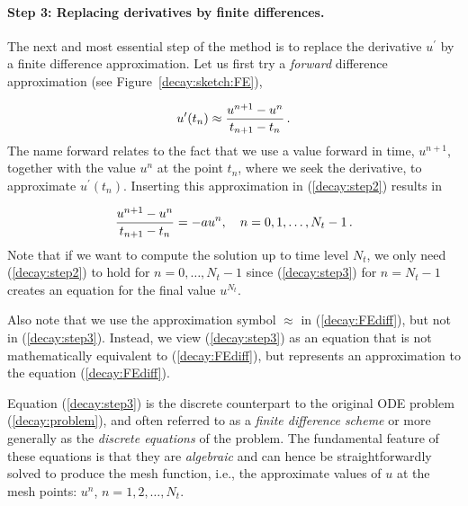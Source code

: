 \documentclass[%
oneside,                 %
final,                   %
10pt]{article}
\begin{document}

\paragraph{Step 3: Replacing derivatives by finite differences.}
The next and most essential step of the method is to replace the
derivative $u^{\prime}$ by a finite difference approximation. Let us first
try a \emph{forward} difference approximation (see Figure~\ref{decay:sketch:FE}),

 

\begin{equation}
u^{\prime}(t_n) \approx \frac{u^{n+1}-u^{n}}{t_{n+1}-t_n}\thinspace .
\label{decay:FEdiff}
\end{equation}
The name forward relates to the fact that we use a value forward in
time, $u^{n+1}$, together with the value $u^n$ at the point $t_n$, where
we seek the derivative, to approximate $u^{\prime}(t_n)$.
Inserting this approximation in (\ref{decay:step2}) results in

\begin{equation}
\frac{u^{n+1}-u^{n}}{t_{n+1}-t_n} = -au^{n},\quad n=0,1,\ldots,N_t-1\thinspace .
\label{decay:step3}
\end{equation}
Note that if we want to compute the solution
up to time level $N_t$,
we only need (\ref{decay:step2}) to hold for $n=0,\ldots,N_t-1$ since
(\ref{decay:step3}) for $n=N_t-1$ creates an equation for the final
value $u^{N_t}$.

Also note that we use the approximation symbol $\approx$ in (\ref{decay:FEdiff}),
but not in (\ref{decay:step3}). Instead, we view (\ref{decay:step3}) as
an equation that is not mathematically equivalent to (\ref{decay:FEdiff}),
but represents an approximation to the equation (\ref{decay:FEdiff}).

Equation (\ref{decay:step3})
is the discrete counterpart to the original ODE problem
(\ref{decay:problem}), and often referred to as a \emph{finite difference scheme}
or more generally as the \emph{discrete equations} of the problem.
The fundamental feature of these equations is that they are \emph{algebraic}
and can hence be straightforwardly solved to produce the mesh function, i.e.,
the approximate values of $u$ at
the mesh points: $u^n$, $n=1,2,\ldots,N_t$.
\end{document}
